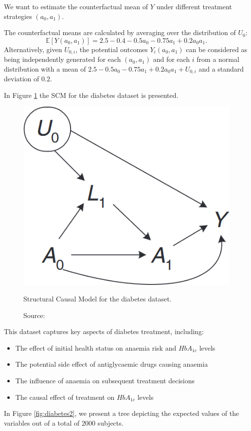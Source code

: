 We want to estimate the counterfactual mean of \( Y \) under
different treatment strategies \( (a_0, a_1) \).

The counterfactual means are calculated by averaging over the
distribution of \( U_0 \):
\begin{equation}
\mathbb{E}[Y(a_0, a_1)] = 2.5 - 0.4 - 0.5a_0 - 0.75a_1 + 0.2a_0a_1.
\end{equation}
Alternatively, given \( U_{0,i} \), the potential outcomes
\( Y_i(a_0, a_1) \) can be considered as being independently
generated for each \((a_0, a_1)\) and for each \(i\) from
a normal distribution with a mean of
\( 2.5 - 0.5a_0 - 0.75a_1 + 0.2a_0a_1 + U_{0,i} \)
and a standard deviation of $0.2$.

In Figure \ref{fig:diabetes1} the SCM for the diabetes dataset
is presented.

\begin{figure}[h]
    \centering
    \includegraphics[width=.21\textwidth]{figures/ch4/diabetes1.png}
    \caption{Structural Causal Model for the diabetes dataset.}
    \vspace{-10px}
    \caption*{\scriptsize{Source: \cite{sim2012}}}
    \label{fig:diabetes1}
\end{figure}

This dataset captures key aspects of diabetes treatment, including:
\begin{itemize}
    \item The effect of initial health status on anaemia risk
    and $HbA_{1c}$ levels
    \item The potential side effect of antiglycaemic drugs causing anaemia
    \item The influence of anaemia on subsequent treatment decisions
    \item The causal effect of treatment on $HbA_{1c}$ levels
\end{itemize}
In Figure \ref{fig:diabetes2}, we present a tree
depicting the expected values of the variables out of
a total of $2000$ subjects.

